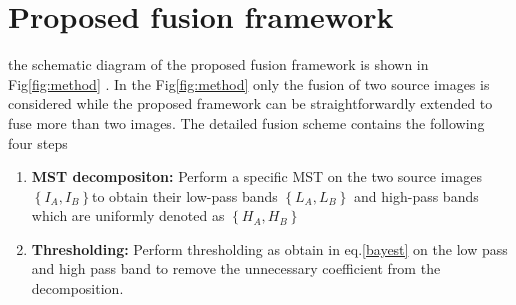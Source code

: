 \section{Proposed fusion framework}
the schematic diagram of the proposed fusion framework is shown in Fig\ref{fig:method} . In the Fig\ref{fig:method} only the fusion of two source images is considered while the proposed framework can be straightforwardly extended to fuse more than two images. The detailed fusion scheme contains the following four steps  \hfill \break


\begin{enumerate}
   \item \textbf{MST decompositon:}   Perform a specific MST on the two source images \( \left\{    {I}_{A},{I}_{B}\right\}  \)to obtain their low-pass bands \(\left\{{L}_{A},{L}_{B}\right\} \) and high-pass bands which are uniformly denoted as
 \(\left\{{H}_{A},{H}_{B}\right \} \)
 \item \textbf{Thresholding:} Perform thresholding as obtain in eq.\ref{bayest} on the low pass and high pass band to remove the unnecessary coefficient from the decomposition.  
    

\end{enumerate}
